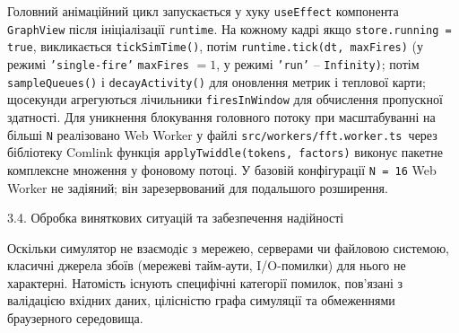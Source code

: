 \documentclass[
]{article}
\newcommand{\passthrough}[1]{#1}
\begin{document}
Головний анімаційний цикл запускається у хуку
\passthrough{\lstinline!useEffect!} компонента
\passthrough{\lstinline!GraphView!} після ініціалізації
\passthrough{\lstinline!runtime!}. На кожному кадрі якщо
\passthrough{\lstinline!store!}\passthrough{\lstinline!.!}\passthrough{\lstinline!running!}\passthrough{\lstinline! !}\passthrough{\lstinline!=!}\passthrough{\lstinline! !}\passthrough{\lstinline!true!},
викликається
\passthrough{\lstinline!tickSimTime!}\passthrough{\lstinline!()!}, потім
\passthrough{\lstinline!runtime!}\passthrough{\lstinline!.!}\passthrough{\lstinline!tick!}\passthrough{\lstinline!(!}\passthrough{\lstinline!dt!}\passthrough{\lstinline!,!}\passthrough{\lstinline! !}\passthrough{\lstinline!maxFires!}\passthrough{\lstinline!)!}
(у режимі
\passthrough{\lstinline!’!}\passthrough{\lstinline!single!}\passthrough{\lstinline!-!}\passthrough{\lstinline!fire!}\passthrough{\lstinline!’!}
\passthrough{\lstinline!maxFires!} \(= 1\), у режимі
\passthrough{\lstinline!’!}\passthrough{\lstinline!run!}\passthrough{\lstinline!’!}
-- \passthrough{\lstinline!Infinity!}\passthrough{\lstinline!)!}; потім
\passthrough{\lstinline!sampleQueues!}\passthrough{\lstinline!()!} і
\passthrough{\lstinline!decayActivity!}\passthrough{\lstinline!()!} для
оновлення метрик і теплової карти; щосекунди агрегуються лічильники
\passthrough{\lstinline!firesInWindow!} для обчислення пропускної
здатності. Для уникнення блокування головного потоку при масштабуванні
на більші \passthrough{\lstinline!N!} реалізовано Web Worker у файлі
\passthrough{\lstinline!src!}\passthrough{\lstinline!/!}\passthrough{\lstinline!workers!}\passthrough{\lstinline!/!}\passthrough{\lstinline!fft!}\passthrough{\lstinline!.!}\passthrough{\lstinline!worker!}\passthrough{\lstinline!.!}\passthrough{\lstinline!ts!}\passthrough{\lstinline! !}через
бібліотеку Comlink функція
\passthrough{\lstinline!applyTwiddle!}\passthrough{\lstinline!(!}\passthrough{\lstinline!tokens!}\passthrough{\lstinline!,!}\passthrough{\lstinline! !}\passthrough{\lstinline!factors!}\passthrough{\lstinline!)!}
виконує пакетне комплексне множення у фоновому потоці. У базовій
конфігурації
\passthrough{\lstinline!N!}\passthrough{\lstinline! !}\passthrough{\lstinline!=!}\passthrough{\lstinline! !}\passthrough{\lstinline!16!}
Web Worker не задіяний; він зарезервований для подальшого розширення.

\protect{}\label{X233d53f55b975de4cf5ff725e3a3cb5b620865a}{}3.4.
Обробка виняткових ситуацій та забезпечення надійності

Оскільки симулятор не взаємодіє з мережею, серверами чи файловою
системою, класичні джерела збоїв (мережеві тайм-аути, I/O-помилки) для
нього не характерні. Натомість існують специфічні категорії помилок,
пов'язані з валідацією вхідних даних, цілісністю графа симуляції та
обмеженнями браузерного середовища.
\end{document}
